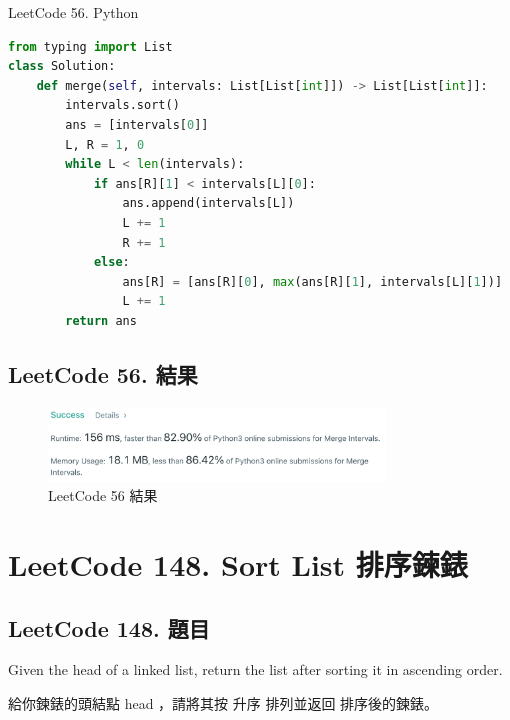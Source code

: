 \documentclass[10pt,UTF8]{ctexart}
\begin{document}
LeetCode 56. Python 

\begin{lstlisting}[language={python}]
from typing import List
class Solution:
    def merge(self, intervals: List[List[int]]) -> List[List[int]]:
        intervals.sort()
        ans = [intervals[0]]
        L, R = 1, 0
        while L < len(intervals):
            if ans[R][1] < intervals[L][0]:
                ans.append(intervals[L])
                L += 1
                R += 1
            else:
                ans[R] = [ans[R][0], max(ans[R][1], intervals[L][1])]
                L += 1
        return ans
\end{lstlisting}

\subsection{LeetCode 56. 結果}

\begin{figure}[H]
\centering 
\includegraphics[width=0.80\textwidth]{lc-56-o.png} 
\caption{LeetCode 56 結果}
\label{Test}
\end{figure}


\newpage

\section{LeetCode 148. Sort List 排序鍊錶}

\subsection{LeetCode 148. 題目}

Given the head of a linked list, return the list after sorting it in ascending order.

給你鍊錶的頭結點 head ，請將其按 升序 排列並返回 排序後的鍊錶。
\end{document}
